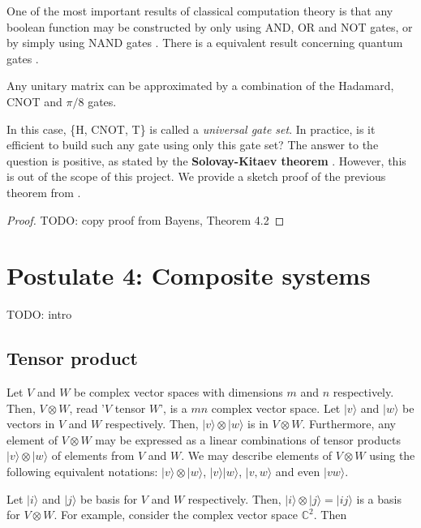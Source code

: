 One of the most important results of classical computation theory is that any boolean function may be constructed by only using AND, OR and NOT gates, or by simply using NAND gates \cite{Lau2006}. There is a equivalent result concerning quantum gates \cite{Bayens2020}.

\begin{theorem}
	Any unitary matrix can be approximated by a combination of the Hadamard, CNOT and $\pi/8$ gates.
\end{theorem}

In this case, \{H, CNOT, T\} is called a \emph{universal gate set}. In practice, is it efficient to build such any gate using only this gate set? The answer to the question is positive, as stated by the \textbf{Solovay-Kitaev theorem} \cite{Dawson2006}. However, this is out of the scope of this project. We provide a sketch proof of the previous theorem from \cite{Bayens2020}.

\begin{proof}
	TODO: copy proof from Bayens, Theorem 4.2
\end{proof}

\section{Postulate 4: Composite systems}

TODO: intro

\subsection{Tensor product}

Let $V$ and $W$ be complex vector spaces with dimensions $m$ and $n$ respectively. Then, $V \otimes W$, read '$V$ tensor $W$', is a $mn$ complex vector space. Let $|v\rangle$ and $|w\rangle$ be vectors in $V$ and $W$ respectively. Then, $|v\rangle \otimes |w\rangle$ is in $V \otimes W$. Furthermore, any element of $V \otimes W$ may be expressed as a linear combinations of tensor products $|v\rangle \otimes |w\rangle$ of elements from $V$ and $W$. We may describe elements of $V \otimes W$ using the following equivalent notations: $|v\rangle \otimes |w\rangle$, $|v\rangle|w\rangle$, $|v, w\rangle$ and even $|vw\rangle$.

Let $|i\rangle$ and $|j\rangle$ be basis for $V$ and $W$ respectively. Then, $|i\rangle \otimes |j\rangle = |ij\rangle$ is a basis for $V \otimes W$. For example, consider the complex vector space $\mathds{C}^2$. Then

